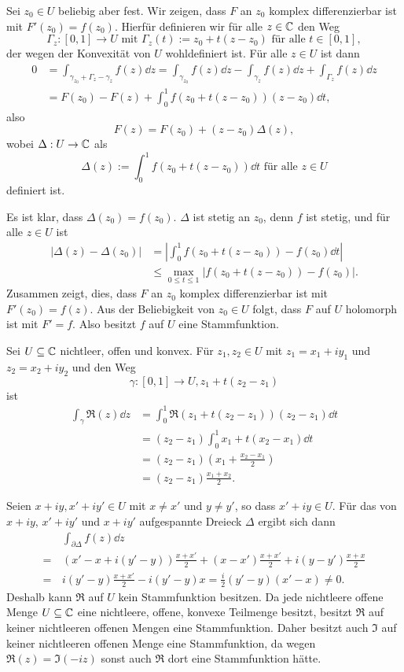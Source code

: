 \documentclass[a4paper,10pt]{article}
\begin{document}
Sei $z_0 \in U$ beliebig aber fest. Wir zeigen, dass $F$ an $z_0$ komplex differenzierbar ist mit $F'(z_0) = f(z_0)$. Hierfür definieren wir für alle $z \in \mathbb{C}$ den Weg
\[
 \Gamma_z : [0,1] \to U \text{ mit } \Gamma_z(t) := z_0 + t(z-z_0) \text{ für alle } t \in [0,1],
\]
der wegen der Konvexität von $U$ wohldefiniert ist. Für alle $z \in U$ ist dann
\begin{align*}
 0
 &= \int_{\gamma_{z_0} + \Gamma_z - \gamma_z} f(z) \dd{z}
 = \int_{\gamma_{z_0}} f(z) \dd{z} - \int_{\gamma_z} f(z) \dd{z} + \int_{\Gamma_z} f(z) \dd{z} \\
 &= F(z_0) - F(z) + \int_0^1 f(z_0 + t(z-z_0))(z-z_0) \dd{t},
\end{align*}
also
\[
 F(z) = F(z_0) + (z-z_0) \Delta(z),
\]
wobei $\Delta : U \to \mathbb{C}$ als
\[
 \Delta(z) := \int_0^1 f(z_0 + t(z-z_0)) \dd{t} \text{ für alle } z \in U
\]
definiert ist.

Es ist klar, dass $\Delta(z_0) = f(z_0)$. $\Delta$ ist stetig an $z_0$, denn $f$ ist stetig, und für alle $z \in U$ ist
\begin{align*}
 |\Delta(z)-\Delta(z_0)|
 &= \left| \int_0^1 f(z_0+t(z-z_0)) - f(z_0) \dd{t} \right| \\
 &\leq \max_{0 \leq t \leq 1} |f(z_0+t(z-z_0))-f(z_0)|.
\end{align*}
Zusammen zeigt, dies, dass $F$ an $z_0$ komplex differenzierbar ist mit $F'(z_0) = f(z)$. Aus der Beliebigkeit von $z_0 \in U$ folgt, dass $F$ auf $U$ holomorph ist mit $F' = f$. Also besitzt $f$ auf $U$ eine Stammfunktion.

Sei $U \subseteq \mathbb{C}$ nichtleer, offen und konvex. Für $z_1, z_2 \in U$ mit $z_1 = x_1 + iy_1$ und $z_2 = x_2 + iy_2$ und den Weg
\[
 \gamma : [0,1] \to U, z_1 + t(z_2 - z_1)
\]
ist
\begin{align*}
 \int_\gamma \Re(z) \dd{z}
 &= \int_0^1 \Re(z_1 + t(z_2 - z_1)) (z_2 - z_1) \dd{t} \\
 &= (z_2 - z_1) \int_0^1 x_1 + t(x_2 - x_1) \dd{t} \\
 &= (z_2 - z_1) \left( x_1 + \frac{x_2 - x_1}{2} \right) \\
 &= (z_2 - z_1) \frac{x_1 + x_2}{2}.
\end{align*}

Seien $x+iy, x'+iy' \in U$ mit $x \neq x'$ und $y \neq y'$, so dass $x'+iy \in U$. Für das von $x+iy$, $x'+iy'$ und $x+iy'$ aufgespannte Dreieck $\Delta$ ergibt sich dann
\begin{align*}
  &\, \int_{\partial \Delta} f(z) \dd{z} \\
 =&\, (x'-x+i(y'-y))\frac{x+x'}{2} + (x-x')\frac{x+x'}{2} + i(y-y')\frac{x+x}{2} \\
 =&\, i(y'-y) \frac{x+x'}{2} - i(y'-y)x
 = \frac{i}{2}(y'-y)(x'-x)
 \neq 0.
\end{align*}
Deshalb kann $\Re$ auf $U$ kein Stammfunktion besitzen. Da jede nichtleere offene Menge $U \subseteq \mathbb{C}$ eine nichtleere, offene, konvexe Teilmenge besitzt, besitzt $\Re$ auf keiner nichtleeren offenen Mengen eine Stammfunktion. Daher besitzt auch $\Im$ auf keiner nichtleeren offenen Menge eine Stammfunktion, da wegen $\Re(z) = \Im(-iz)$ sonst auch $\Re$ dort eine Stammfunktion hätte.
\end{document}
